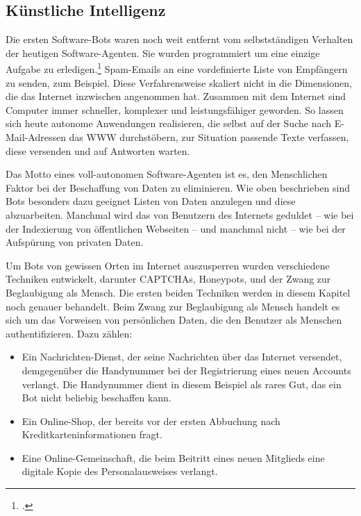 \subsection{Künstliche Intelligenz} %
\label{sub:kunstliche_intelligenz}
Die ersten Software-Bots waren noch weit entfernt vom selbstständigen Verhalten
der heutigen Software-Agenten. Sie wurden programmiert um eine einzige Aufgabe
zu erledigen.\footcite{wa:spamFilter} Spam-Emails an eine
vordefinierte Liste von Empfängern zu senden, zum Beispiel. Diese
Verfahrensweise skaliert nicht in die Dimensionen, die das Internet inzwischen
angenommen hat. Zusammen mit dem Internet sind Computer immer schneller,
komplexer und leistungsfähiger geworden. So lassen sich heute autonome
Anwendungen realisieren, die selbst auf der Suche nach E-Mail-Adressen das WWW
durchstöbern, zur Situation passende Texte verfassen, diese versenden und auf
Antworten warten.

Das Motto eines voll-autonomen Software-Agenten ist es, den Menschlichen Faktor
bei der Beschaffung von Daten zu eliminieren. Wie oben beschrieben sind Bots
besonders dazu geeignet Listen von Daten anzulegen und diese abzuarbeiten.
Manchmal wird das von Benutzern des Internets geduldet -- wie bei der
Indexierung von öffentlichen Webseiten -- und manchmal nicht -- wie bei der
Aufspürung von privaten Daten.

Um Bots von gewissen Orten im Internet auszusperren wurden verschiedene
Techniken entwickelt, darunter CAPTCHAs, Honeypots, und der Zwang zur
Beglaubigung als Mensch. Die ersten beiden Techniken werden in diesem Kapitel
noch genauer behandelt. Beim Zwang zur Beglaubigung als Mensch handelt es sich
um das Vorweisen von persönlichen Daten, die den Benutzer als Menschen
authentifizieren. Dazu zählen:

\begin{itemize}
\item
  Ein Nachrichten-Dienst, der seine Nachrichten über das Internet versendet,
  demgegenüber die Handynummer bei der Registrierung eines neuen Accounts
  verlangt. Die Handynummer dient in diesem Beispiel als rares Gut, das ein Bot
  nicht beliebig beschaffen kann.
\item
  Ein Online-Shop, der bereits vor der ersten Abbuchung nach
  Kreditkarteninformationen fragt.
\item
  Eine Online-Gemeinschaft, die beim Beitritt eines neuen Mitglieds eine
  digitale Kopie des Personalausweises verlangt.
\end{itemize}

